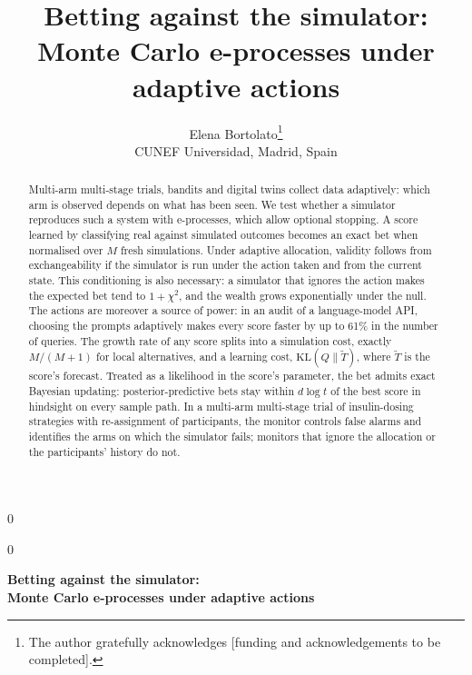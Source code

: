 \documentclass[12pt]{article}
\newcommand{\KL}{\mathrm{KL}}
\theoremstyle{remark}
\newcommand{\blind}{0}
\begin{document}
\blind
{
  \title{\bf Betting against the simulator:\\
  Monte Carlo e-processes under adaptive actions}
  \author{Elena Bortolato\thanks{The author gratefully acknowledges [funding and acknowledgements to be completed].}\hspace{.2cm}\\
    CUNEF Universidad, Madrid, Spain}
  \date{}
  \maketitle
} \fi

\blind
{
  \bigskip
  \bigskip
  \bigskip
  \begin{center}
    {\LARGE\bf Betting against the simulator:\\[4pt]
    Monte Carlo e-processes under adaptive actions}
  \end{center}
  \medskip
} \fi

\bigskip
\begin{abstract}
Multi-arm multi-stage trials, bandits and digital twins collect data
adaptively: which arm is observed depends on what has been seen. We test whether a simulator reproduces such a
system with e-processes, which allow optional stopping. A score learned by classifying real against simulated
outcomes becomes an exact bet when normalised over $M$ fresh simulations. Under adaptive allocation, validity follows from
exchangeability if the simulator is run under the action taken and from the
current state. This conditioning is also necessary: a simulator that ignores
the action makes the expected bet tend to $1+\chi^2$, and the wealth grows
exponentially under the null. The actions are moreover a source of power: in
an audit of a language-model API, choosing the prompts
adaptively makes every score faster by
up to 61\% in the number of queries. The growth rate of any score splits into
a simulation cost, exactly $M/(M+1)$ for local alternatives, and a learning
cost, $\KL(Q\|\tilde T)$, where $\tilde T$ is the score's forecast.
Treated as a likelihood in the score's parameter, the bet admits exact
Bayesian updating: posterior-predictive bets stay within $d\log t$ of the best score in hindsight on
every sample path. In a multi-arm multi-stage trial of insulin-dosing strategies with
re-assignment of participants, the monitor controls
false alarms and identifies the arms on which the simulator fails; monitors
that ignore the allocation or the participants' history do not.
\end{abstract}
\end{document}
